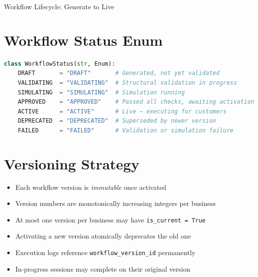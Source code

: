 \documentclass[12pt, a4paper]{report}
\begin{document}
\begin{center}
\caption{Workflow Lifecycle: Generate to Live}
\end{center}

\section{Workflow Status Enum}

\begin{lstlisting}[language=Python]
class WorkflowStatus(str, Enum):
    DRAFT       = "DRAFT"       # Generated, not yet validated
    VALIDATING  = "VALIDATING"  # Structural validation in progress
    SIMULATING  = "SIMULATING"  # Simulation running
    APPROVED    = "APPROVED"    # Passed all checks, awaiting activation
    ACTIVE      = "ACTIVE"      # Live — executing for customers
    DEPRECATED  = "DEPRECATED"  # Superseded by newer version
    FAILED      = "FAILED"      # Validation or simulation failure
\end{lstlisting}

\section{Versioning Strategy}

\begin{itemize}
  \item Each workflow version is \textit{immutable} once activated
  \item Version numbers are monotonically increasing integers per business
  \item At most one version per business may have \texttt{is\_current = True}
  \item Activating a new version atomically deprecates the old one
  \item Execution logs reference \texttt{workflow\_version\_id} permanently
  \item In-progress sessions may complete on their original version
\end{itemize}
\end{document}
